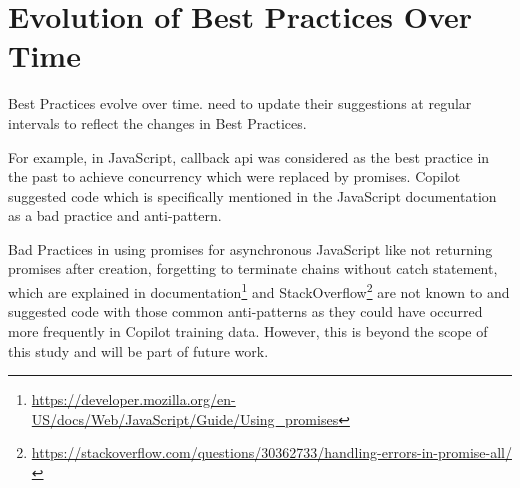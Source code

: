 \section{Evolution of Best Practices Over Time}
\label{evolution}
Best Practices evolve over time. \cct{} need to update their suggestions at regular intervals to reflect the changes in Best Practices. 

For example, in JavaScript, callback api was considered as the best practice in the past to achieve concurrency which were replaced by promises. Copilot suggested code which is specifically mentioned in the JavaScript documentation as a bad practice and anti-pattern.

Bad Practices in using promises for asynchronous JavaScript like not returning promises after creation, forgetting to terminate chains without catch statement, which are explained in documentation\footnote{\label{docs}\url{https://developer.mozilla.org/en-US/docs/Web/JavaScript/Guide/Using_promises}} and StackOverflow\footnote{\url{https://stackoverflow.com/questions/30362733/handling-errors-in-promise-all/}} are not known to \cop{} and suggested code with those common anti-patterns as they could have occurred more frequently in Copilot training data. However, this is beyond the scope of this study and will be part of future work.